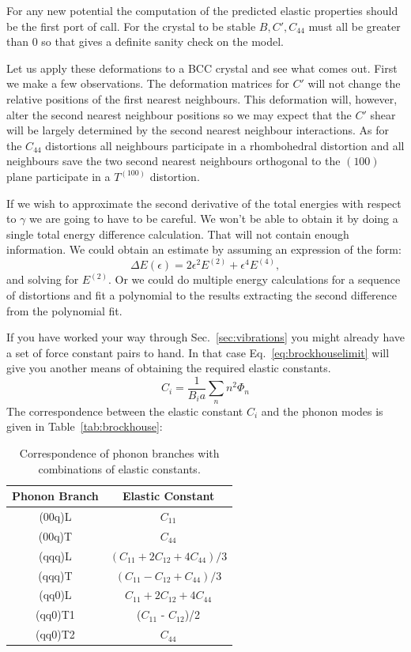 For any new potential the computation of the predicted elastic properties should
be the first port of call. For the crystal to be stable $B,C',C_{44}$ must all be
greater than 0 so that gives a definite sanity check on the model. 

Let us apply these deformations to a BCC crystal and see what comes out.
First we make a few observations. The deformation matrices for
$C'$ will not change the relative positions of the first nearest neighbours.
This deformation will, however, alter the second nearest neighbour positions so we may expect
that the $C'$ shear will be largely determined by the second nearest neighbour interactions. 
As for the $C_{44}$ distortions all neighbours participate in a rhombohedral distortion
and all neighbours save the two second nearest neighbours orthogonal to the $(100)$
plane participate in a $T^{(100)}$ distortion. 

If we wish to approximate the second derivative of the total energies with 
respect to $\gamma$ we are going to have to be careful. We won't be able
to obtain it by doing a single total energy difference calculation. That
will not contain enough information. We could obtain an estimate by assuming
an expression of the form: 
%
\begin{equation}
\Delta E(\epsilon) = 2\epsilon^{2} E^{(2)} + \epsilon^{4} E^{(4)},
\end{equation}
%
and solving for $E^{(2)}$. Or we could do multiple energy calculations for 
a sequence of distortions and fit a polynomial to the results extracting
the second difference from the polynomial fit.

If you have worked your way through Sec.~\ref{sec:vibrations} you might already have
a set of force constant pairs to hand. In that case Eq.~\ref{eq:brockhouselimit} will give you
another means of obtaining the required elastic constants.
%
\begin{equation}
\label{eq:brockhouselimit}
C_{i} = \frac{1}{B_{i}a}\sum_{n} n^{2}\Phi_{n}
\end{equation}
%
The correspondence between the elastic constant $C_{i}$ and the phonon modes is given
in Table~\ref{tab:brockhouse}:

\begin{table}
\begin{center}
\begin{tabular}{|c|c|}
\hline
Phonon Branch  & Elastic Constant \\
\hline
(00q)L  & $C_{11}$ \\
(00q)T  & $C_{44}$ \\
(qqq)L  & $(C_{11}+2C_{12}+4C_{44})/3$ \\
(qqq)T  & $(C_{11}-C_{12}+C_{44})/3$ \\
(qq0)L  & $C_{11}+2C_{12}+4C_{44}$ \\
(qq0)T1 & ($C_{11}$ - $C_{12}$)/2\\
(qq0)T2 & $C_{44}$\\
\hline
\end{tabular}

\caption{Correspondence of phonon branches with combinations of elastic constants.}
\end{center}
\end{table}

